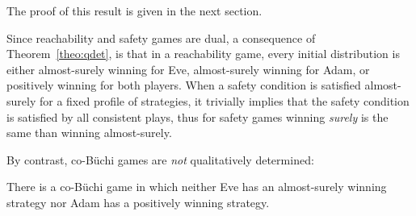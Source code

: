 The proof of this result is given in the next section.

Since reachability and safety games are dual, a consequence of
Theorem~\ref{theo:qdet}, is that in a reachability game, every initial
distribution is either almost-surely winning for Eve,
almost-surely winning for Adam, or positively
winning for both players.
When a safety condition is satisfied almost-surely for a fixed profile of strategies,
it trivially implies that the safety condition is
satisfied by all consistent plays,
thus for safety games winning \emph{surely} is the same than winning almost-surely.



By contrast, co-B\"uchi games are \emph{not} qualitatively determined:
\begin{lemma}
There is a co-B\"uchi game in which neither Eve has an almost-surely winning strategy
nor Adam has a positively winning strategy.
\end{lemma}

